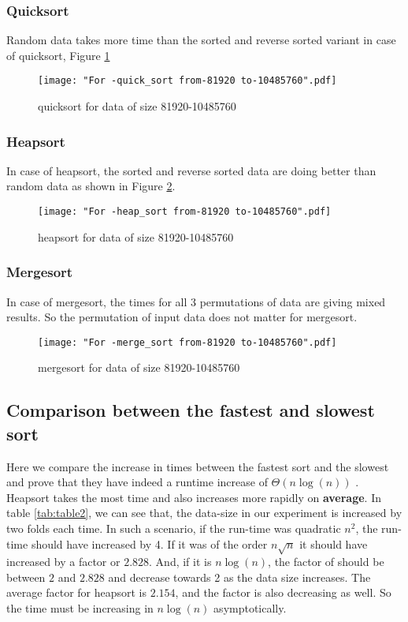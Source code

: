 \documentclass[sigconf, nonacm, natbib, screen, balance=False]{acmart}
\begin{document}
\subsubsection{Quicksort}
Random data takes more time than the sorted and reverse sorted variant in case of quicksort, Figure \ref{fig:quicksort}

\begin{figure}[ht]
\texttt{[image: "For -quick\_sort from-81920 to-10485760".pdf]}
    \caption{quicksort for data of size 81920-10485760 }
    \label{fig:quicksort}
\end{figure}

\subsubsection{Heapsort}
In case of heapsort, the sorted and reverse sorted data are doing better than random data as shown in Figure \ref{fig:heapsort}.
\begin{figure}[ht]
\texttt{[image: "For -heap\_sort from-81920 to-10485760".pdf]}
    \caption{heapsort for data of size 81920-10485760 }
    \label{fig:heapsort}
\end{figure}

\subsubsection{Mergesort}
In case of mergesort, the times for all 3 permutations of data are giving mixed results. So the permutation of input data does not matter for mergesort.

\begin{figure}[ht]
\texttt{[image: "For -merge\_sort from-81920 to-10485760".pdf]}
    \caption{mergesort for data of size 81920-10485760 }
    \label{fig:mergesort}
\end{figure}


\subsection{Comparison between the fastest and slowest sort}\label{math}
Here we compare the increase in times between the fastest sort and the slowest and prove that they have indeed a runtime increase of $\Theta \left(n \log\left(n\right)\right)$ . Heapsort  takes the most time and also increases more rapidly on \textbf{average}. In table \ref{tab:table2}, we can see that, the data-size in our experiment is increased by two folds each time. In such a scenario, if the run-time was quadratic $n^2$, the run-time should have increased by 4. If it was of the order $n\sqrt{n}$ it should have increased by a factor or $2.828$. And, if it is $n\log\left(n\right)$, the factor of should be between $2$ and $2.828$ and decrease towards 2 as the data size increases. The average factor for heapsort is $2.154$, and the factor is also decreasing as well. So the time must be increasing in $n\log\left(n\right)$ asymptotically. 
\end{document}
